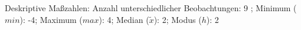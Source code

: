 				\label{tableValues:cski02a}
				\vspace*{-\baselineskip}
                    \begin{noten}
                	    \note{} Deskriptive Maßzahlen:
                	    Anzahl unterschiedlicher Beobachtungen: 9%
                	    ; 
                	      Minimum ($min$): -4; 
                	      Maximum ($max$): 4; 
                	      Median ($\tilde{x}$): 2; 
                	      Modus ($h$): 2
                     \end{noten}


